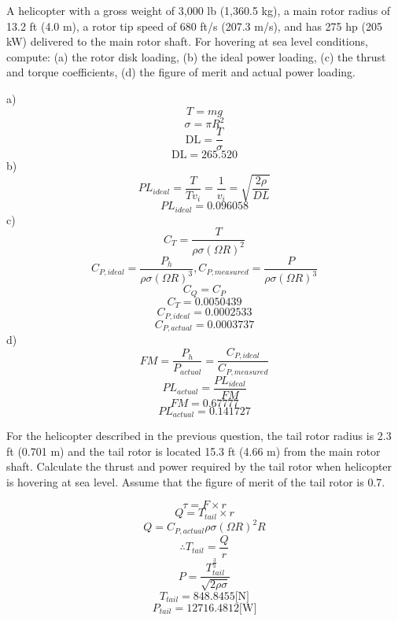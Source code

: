 \documentclass[12pt]{exam}
\begin{document}
\begin{questions}
\begin{solutionorbox}[\stretch{1}]
\end{solutionorbox}


\newpage 
\begin{question}
A helicopter with a gross weight of 3,000 lb (1,360.5 kg), a main rotor radius of 13.2 ft
(4.0 m), a rotor tip speed of 680 ft/s (207.3 m/s), and has 275 hp (205 kW) delivered to the
main rotor shaft. For hovering at sea level conditions, compute: (a) the rotor disk loading,
(b) the ideal power loading, (c) the thrust and torque coefficients, (d) the figure of merit
and actual power loading.
\end{question}
\begin{solutionorbox}[\stretch{1}]
a)
\[ T = mg \]
\[ \sigma = \pi R^2 \]
\[ \text{DL} = \frac{T}{\sigma} \]
\[\text{DL} = 265.520\]
b)
\[PL_{ideal} = \frac{T}{Tv_i} = \frac{1}{v_i} = \sqrt{\frac{2\rho}{DL}}\]
\[PL_{ideal} = 0.096058\]
c)
\[ C_T = \frac{T}{\rho\sigma(\Omega R)^2} \]
\[ C_{P,ideal} = \frac{P_h}{\rho\sigma(\Omega R)^3},C_{P,measured} = \frac{P}{\rho\sigma(\Omega R)^3} \]
\[C_Q = C_P\]
\[C_T = 0.0050439\]
\[C_{P,ideal} = 0.0002533\]
\[C_{P,actual} = 0.0003737\]
d)
\[ FM = \frac{P_h}{P_{actual}} = \frac{C_{P,ideal}}{C_{P,measured}} \]
\[ PL_{actual} = \frac{PL_{ideal}}{FM} \]
\[FM = 0.67777\]
\[PL_{actual} = 0.141727\]
\end{solutionorbox}


\newpage 
\begin{question}
For the helicopter described in the previous question, the tail rotor radius is 2.3 ft (0.701
m) and the tail rotor is located 15.3 ft (4.66 m) from the main rotor shaft. Calculate the
thrust and power required by the tail rotor when helicopter is hovering at sea level. Assume
that the figure of merit of the tail rotor is 0.7.
\end{question}
\begin{solutionorbox}[\stretch{1}]
\[ \tau = F \times r \]
\[ Q = T_{tail} \times r \]
\[ Q = C_{P,actual} \rho \sigma \left(\Omega R\right)^2 R \]
\[ \therefore T_{tail} = \frac{Q}{r} \]
\[ P = \frac{T_{tail}^\frac{3}{2}}{\sqrt{2\rho\sigma}} \]
\[T_{tail} = 848.8455 \text{[N]}\]
\[P_{tail} = 12716.4812 \text{[W]}\]
\end{solutionorbox}



\end{questions}
\end{document}
